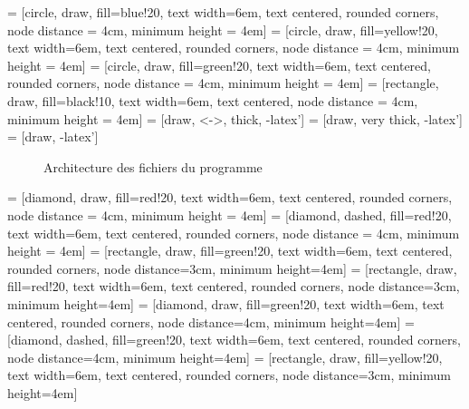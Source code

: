 \documentclass[a4paper, 11pt]{article}
\begin{document}
 = [circle, draw, fill=blue!20, 
    text width=6em, text centered, rounded corners, node distance = 4cm, minimum height = 4em]
 = [circle, draw, fill=yellow!20, 
    text width=6em, text centered, rounded corners, node distance = 4cm, minimum height = 4em]
 = [circle, draw, fill=green!20, 
    text width=6em, text centered, rounded corners, node distance = 4cm, minimum height = 4em]
 = [rectangle, draw, fill=black!10, text width=6em, text centered, node distance = 4cm, minimum height = 4em]
 = [draw, <->, thick, -latex']
 = [draw, very thick, -latex']
 = [draw, -latex']

    
\begin{figure}[H]
\centering
{}
\caption{Architecture des fichiers du programme}
\end{figure}

\newpage

 = [diamond, draw, fill=red!20, 
    text width=6em, text centered, rounded corners, node distance = 4cm, minimum height = 4em]
 = [diamond, dashed, fill=red!20, 
    text width=6em, text centered, rounded corners, node distance = 4cm, minimum height = 4em]
 = [rectangle, draw, fill=green!20, 
    text width=6em, text centered, rounded corners, node distance=3cm, minimum height=4em]
 = [rectangle, draw, fill=red!20, 
    text width=6em, text centered, rounded corners, node distance=3cm, minimum height=4em]
 = [diamond, draw, fill=green!20, 
    text width=6em, text centered, rounded corners, node distance=4cm, minimum height=4em]
 = [diamond, dashed, fill=green!20, 
    text width=6em, text centered, rounded corners, node distance=4cm, minimum height=4em]
 = [rectangle, draw, fill=yellow!20, 
    text width=6em, text centered, rounded corners, node distance=3cm, minimum height=4em]
\end{document}
